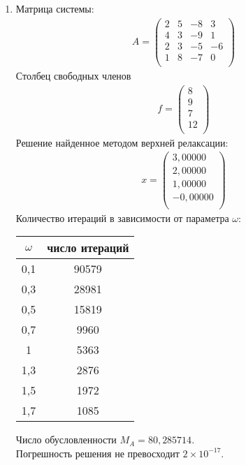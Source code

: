 \documentclass[a4paper,12pt,titlepage,finall]{article}
\begin{document}
\begin{enumerate}
\item
Матрица системы:
\begin{align*}
A = \begin{pmatrix}
2&           5&          -8&           3 \\
         4&           3&          -9&           1 \\
         2&           3&          -5&          -6 \\
         1&           8&          -7&           0 \\
\end{pmatrix}
\end{align*}
Столбец свободных членов
\begin{align*}
f = \begin{pmatrix}
8 \\
         9 \\
         7 \\
        12 \\
\end{pmatrix}
\end{align*}
Решение найденное методом верхней релаксации:
\begin{align*}
x = \begin{pmatrix}
3,00000 \\
   2,00000 \\
   1,00000 \\
  -0,00000 \\
\end{pmatrix}
\end{align*}
Количество итераций в зависимости от параметра $\omega$:
\begin{center}
\begin{tabular}{|c|c|}
\hline
$\omega$ & число итераций\\
\hline
0,1 & 90579\\
0,3 & 28981\\
0,5 & 15819\\
0,7 & 9960\\
 1 & 5363\\
 1,3 & 2876\\
 1,5 & 1972\\
 1,7 & 1085\\
 \hline
\end{tabular}
\end{center}

Число обусловленности $M_A = 80,285714$.\\
Погрешность решения не превосходит $2 \times 10^{-17}$.


\end{enumerate}
\end{document}
